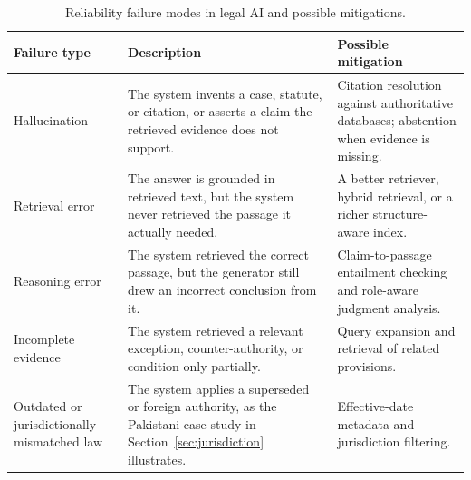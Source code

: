 \begin{table}[tp]
\centering
\caption{Reliability failure modes in legal AI and possible mitigations.}
\label{tab:failures}
\footnotesize
\setlength{\tabcolsep}{5pt}
\renewcommand{\arraystretch}{1.25}
\begin{tabularx}{\textwidth}{>{\raggedright\arraybackslash}p{2.6cm} >{\raggedright\arraybackslash}X >{\raggedright\arraybackslash}X}
\toprule
\textbf{Failure type} & \textbf{Description} & \textbf{Possible mitigation} \\
\midrule
Hallucination \citep{dahl2024, butler2026} & The system invents a case, statute, or citation, or asserts a claim the retrieved evidence does not support. & Citation resolution against authoritative databases; abstention when evidence is missing. \\
Retrieval error \citep{butler2026} & The answer is grounded in retrieved text, but the system never retrieved the passage it actually needed. & A better retriever, hybrid retrieval, or a richer structure-aware index. \\
Reasoning error \citep{butler2026} & The system retrieved the correct passage, but the generator still drew an incorrect conclusion from it. & Claim-to-passage entailment checking and role-aware judgment analysis. \\
Incomplete evidence & The system retrieved a relevant exception, counter-authority, or condition only partially. & Query expansion and retrieval of related provisions. \\
Outdated or jurisdictionally mismatched law & The system applies a superseded or foreign authority, as the Pakistani case study in Section~\ref{sec:jurisdiction} illustrates. & Effective-date metadata and jurisdiction filtering. \\
\bottomrule
\end{tabularx}
\end{table}

